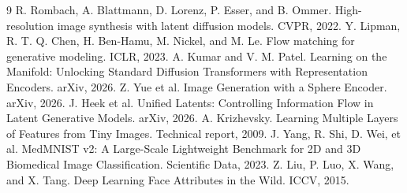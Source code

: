 \documentclass{article}
\begin{document}
\clearpage
{\small
\begin{thebibliography}{9}
 R. Rombach, A. Blattmann, D. Lorenz, P. Esser, and B. Ommer. High-resolution image synthesis with latent diffusion models. CVPR, 2022.
 Y. Lipman, R. T. Q. Chen, H. Ben-Hamu, M. Nickel, and M. Le. Flow matching for generative modeling. ICLR, 2023.
 A. Kumar and V. M. Patel. Learning on the Manifold: Unlocking Standard Diffusion Transformers with Representation Encoders. arXiv, 2026.
 Z. Yue et al. Image Generation with a Sphere Encoder. arXiv, 2026.
 J. Heek et al. Unified Latents: Controlling Information Flow in Latent Generative Models. arXiv, 2026.
 A. Krizhevsky. Learning Multiple Layers of Features from Tiny Images. Technical report, 2009.
 J. Yang, R. Shi, D. Wei, et al. MedMNIST v2: A Large-Scale Lightweight Benchmark for 2D and 3D Biomedical Image Classification. Scientific Data, 2023.
 Z. Liu, P. Luo, X. Wang, and X. Tang. Deep Learning Face Attributes in the Wild. ICCV, 2015.
\end{thebibliography}}
\end{document}
